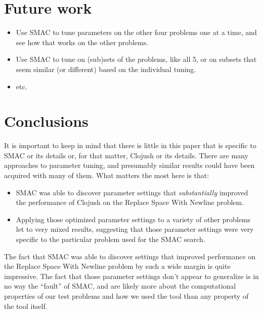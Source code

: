\section{Future work}
\label{sec:futureWork}

\begin{itemize}
	\item Use SMAC to tune parameters on the other four problems one at a time, and see how that works on the other problems.
	\item Use SMAC to tune on (sub)sets of the problems, like all 5, or on subsets that seem similar (or different) based on the individual tuning.
	\item etc.
\end{itemize}

\section{Conclusions}
\label{sec:conclusion}

It is important to keep in mind that there is little in this paper that is
specific to SMAC or its details or, for that matter, Clojush or its details. 
There are many approaches to parameter
tuning, and presumably similar results could have been acquired with many of
them. What matters the most here is that:
\begin{itemize}
	\item SMAC was able to discover parameter settings that 
	\emph{substantially} improved the performance
	of Clojush on the Replace Space With Newline problem.
	\item Applying those optimized parameter settings to a variety of other
	problems let to very mixed results, suggesting that those parameter
	settings were very specific to the particular problem used for the SMAC
	search.
\end{itemize}
The fact that SMAC was able to discover settings that improved
performance on the Replace Space With Newline problem by such a wide margin
is quite impressive. The fact that those parameter settings don't appear to
generalize is in no way the ``fault'' of SMAC, and are likely more 
about the computational properties of our test problems and how we used 
the tool than any property of the tool itself.

